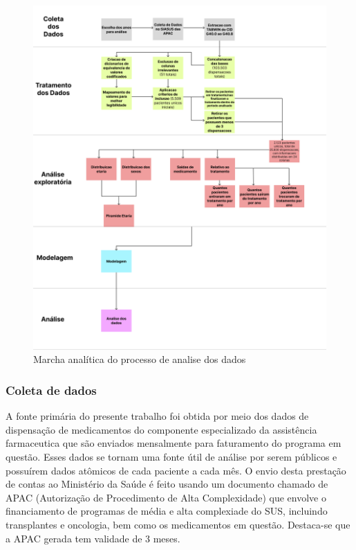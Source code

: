 \documentclass[article,a4paper,12pt,brazil,sumario=tradicional]{abntex2}
\begin{document}
\begin{figure}[!ht]
    \centering
    \includegraphics[width=1\textwidth]{marcha_analitica.png}
    \caption{Marcha analítica do processo de analise dos dados}
\end{figure}

\subsubsection{Coleta de dados}

A fonte primária do presente trabalho foi obtida por meio dos dados de dispensação de medicamentos do componente especializado da assistência farmaceutica que são enviados mensalmente para faturamento do programa em questão. Esses dados se tornam uma fonte útil de análise por serem públicos e possuírem dados atômicos de cada paciente a cada mês. O envio desta prestação de contas ao Ministério da Saúde é feito usando um documento chamado de APAC (Autorização de Procedimento de Alta Complexidade) que envolve o financiamento de programas de média e alta complexiade do SUS, incluindo transplantes e oncologia, bem como os medicamentos em questão. Destaca-se que a APAC gerada tem validade de 3 meses.
\end{document}
